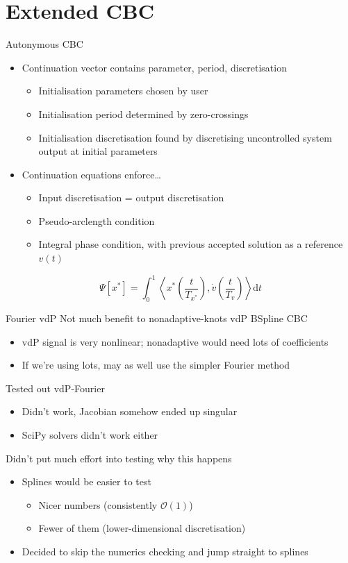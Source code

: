 \documentclass[presentation]{beamer}
\begin{document}
\section{Extended CBC}
\label{sec:org9899f34}
\begin{frame}[label={sec:org507bf4f}]{Autonymous CBC}
\begin{itemize}
\item Continuation vector contains parameter, period, discretisation
\begin{itemize}
\item Initialisation parameters chosen by user
\item Initialisation period determined by zero-crossings
\item Initialisation discretisation found by discretising uncontrolled system output at initial parameters
\end{itemize}
\end{itemize}
\vfill
\begin{itemize}
\item Continuation equations enforce\ldots{}
\begin{itemize}
\item Input discretisation = output discretisation
\item Pseudo-arclength condition
\item Integral phase condition, with previous accepted solution as a reference \(v(t)\)
\end{itemize}
\end{itemize}
\vfill
\[\Psi[x^*] = \int_0^1 \left\langle x^*\left(\frac{t}{T_{x^*}}\right),  \dot{v}\left(\frac{t}{T_v}\right) \right\rangle \mathrm{d}t\]
\end{frame}

\begin{frame}[label={sec:orgd605a04}]{Fourier vdP}
Not much benefit to nonadaptive-knots vdP BSpline CBC
\begin{itemize}
\item vdP signal is very nonlinear; nonadaptive would need lots of coefficients
\item If we're using lots, may as well use the simpler Fourier method
\end{itemize}
\vfill
Tested out vdP-Fourier
\begin{itemize}
\item Didn't work, Jacobian somehow ended up singular
\item SciPy solvers didn't work either
\end{itemize}
\vfill
Didn't put much effort into testing why this happens
\begin{itemize}
\item Splines would be easier to test
\begin{itemize}
\item Nicer numbers (consistently \(\mathcal{O}(1)\))
\item Fewer of them (lower-dimensional discretisation)
\end{itemize}
\item Decided to skip the numerics checking and jump straight to splines
\end{itemize}
\end{frame}
\end{document}
